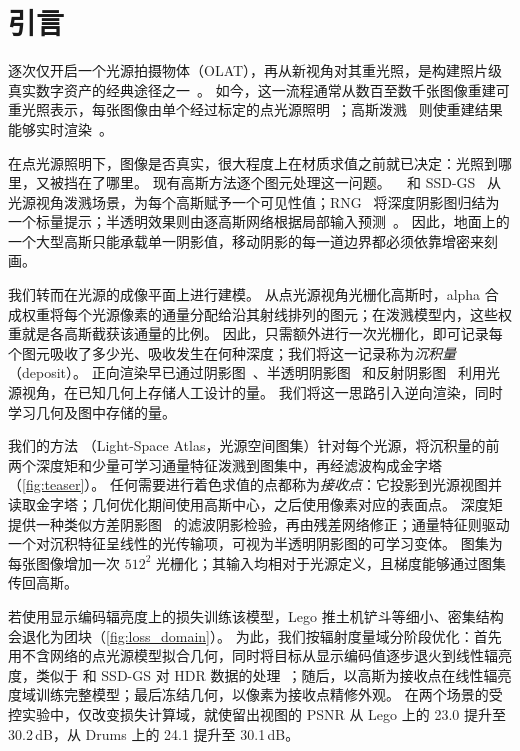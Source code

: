 \section{引言}
\label{sec:intro}

逐次仅开启一个光源拍摄物体（OLAT），再从新视角对其重光照，是构建照片级真实数字资产的经典途径之一~\cite{debevec2000acquiring}。
如今，这一流程通常从数百至数千张图像重建可重光照表示，每张图像由单个经过标定的点光源照明~\cite{bi2020neural,zeng2023nrhints}；高斯泼溅~\cite{kerbl20233d} 则使重建结果能够实时渲染~\cite{bi2024gs3,kuang2024olat,fan2025rng,liu2025bigs,zheng2026ssdgs}。

在点光源照明下，图像是否真实，很大程度上在材质求值之前就已决定：光照到哪里，又被挡在了哪里。
现有高斯方法逐个图元处理这一问题。
\gsthree~\cite{bi2024gs3} 和 SSD-GS~\cite{zheng2026ssdgs} 从光源视角泼溅场景，为每个高斯赋予一个可见性值；RNG~\cite{fan2025rng} 将深度阴影图归结为一个标量提示；半透明效果则由逐高斯网络根据局部输入预测~\cite{dihlmann2024sss,zheng2026ssdgs}。
因此，地面上的一个大型高斯只能承载单一阴影值，移动阴影的每一道边界都必须依靠增密来刻画。

我们转而在光源的成像平面上进行建模。
从点光源视角光栅化高斯时，alpha 合成权重将每个光源像素的通量分配给沿其射线排列的图元；在泼溅模型内，这些权重就是各高斯截获该通量的比例。
因此，只需额外进行一次光栅化，即可记录每个图元吸收了多少光、吸收发生在何种深度；我们将这一记录称为\emph{沉积量}（deposit）。
正向渲染早已通过阴影图~\cite{williams1978casting,donnelly2006variance,peters2015moment}、半透明阴影图~\cite{dachsbacher2003translucent} 和反射阴影图~\cite{dachsbacher2005reflective} 利用光源视角，在已知几何上存储人工设计的量。
我们将这一思路引入逆向渲染，同时学习几何及图中存储的量。

我们的方法 \ours（Light-Space Atlas，光源空间图集）针对每个光源，将沉积量的前两个深度矩和少量可学习通量特征泼溅到图集中，再经滤波构成金字塔（\cref{fig:teaser}）。
任何需要进行着色求值的点都称为\emph{接收点}：它投影到光源视图并读取金字塔；几何优化期间使用高斯中心，之后使用像素对应的表面点。
深度矩提供一种类似方差阴影图~\cite{donnelly2006variance} 的滤波阴影检验，再由残差网络修正；通量特征则驱动一个对沉积特征呈线性的光传输项，可视为半透明阴影图的可学习变体。
图集为每张图像增加一次 $512^2$ 光栅化；其输入均相对于光源定义，且梯度能够通过图集传回高斯。

若使用显示编码辐亮度上的损失训练该模型，Lego 推土机铲斗等细小、密集结构会退化为团块（\cref{fig:loss_domain}）。
为此，我们按辐射度量域分阶段优化：首先用不含网络的点光源模型拟合几何，同时将目标从显示编码值逐步退火到线性辐亮度，类似于 \gsthree 和 SSD-GS 对 HDR 数据的处理~\cite{bi2024gs3,zheng2026ssdgs}；随后，以高斯为接收点在线性辐亮度域训练完整模型；最后冻结几何，以像素为接收点精修外观。
在两个场景的受控实验中，仅改变损失计算域，就使留出视图的 PSNR 从 Lego 上的 23.0 提升至 30.2\,dB，从 Drums 上的 24.1 提升至 30.1\,dB。

